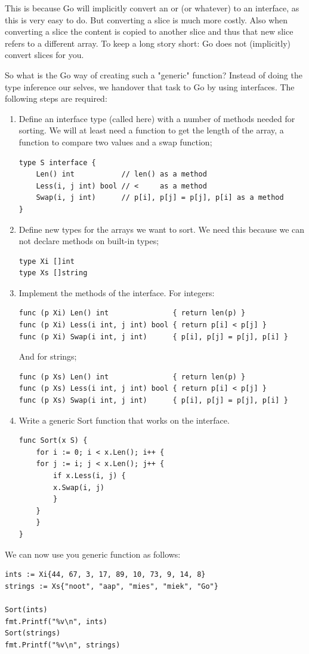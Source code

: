 This is because Go will implicitly convert an  or
 (or whatever) to an interface, as this is very easy to
do. But converting a slice is much more costly. Also when
converting a slice the content is copied to another slice and thus
that new slice refers to a different array. To keep a 
long story short: Go does not (implicitly) convert slices for you.

So what is the Go way of creating such a "generic" function? 
Instead of doing the type inference our selves, we handover 
that task to Go by using interfaces.
The following steps are required:
\begin{enumerate}
\item Define an interface type (called  here) with a number of 
methods needed for sorting.
We will at least need a function to get the length of the array,
a function to compare two values and a swap function;
\begin{lstlisting}
type S interface {
    Len() int           // len() as a method
    Less(i, j int) bool // <     as a method
    Swap(i, j int)      // p[i], p[j] = p[j], p[i] as a method
}
\end{lstlisting}
\item Define new types for the arrays we want to sort. We need this
because we can not declare methods on built-in types;
\begin{lstlisting}
type Xi []int
type Xs []string
\end{lstlisting}
\item Implement the methods of the  interface.
For integers:
\begin{lstlisting}
func (p Xi) Len() int               { return len(p) }
func (p Xi) Less(i int, j int) bool { return p[i] < p[j] }
func (p Xi) Swap(i int, j int)      { p[i], p[j] = p[j], p[i] }
\end{lstlisting}
And for strings;
\begin{lstlisting}
func (p Xs) Len() int               { return len(p) }
func (p Xs) Less(i int, j int) bool { return p[i] < p[j] }
func (p Xs) Swap(i int, j int)      { p[i], p[j] = p[j], p[i] }
\end{lstlisting}
\item Write a generic Sort function that works on the  interface.
\begin{lstlisting}
func Sort(x S) {
    for i := 0; i < x.Len(); i++ {
	for j := i; j < x.Len(); j++ {
	    if x.Less(i, j) {
		x.Swap(i, j)
	    }
	}
    }
}
\end{lstlisting}
\end{enumerate}
We can now use you generic  function as follows:
\begin{lstlisting}
ints := Xi{44, 67, 3, 17, 89, 10, 73, 9, 14, 8}
strings := Xs{"noot", "aap", "mies", "miek", "Go"}

Sort(ints)
fmt.Printf("%v\n", ints)
Sort(strings)
fmt.Printf("%v\n", strings)
\end{lstlisting}

